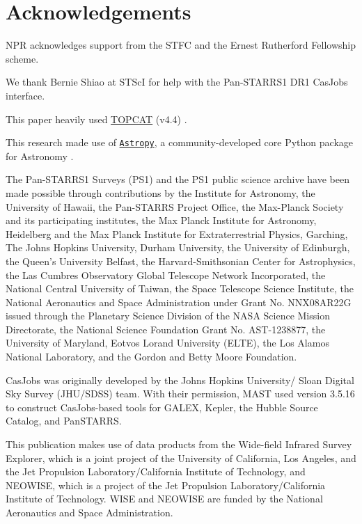 \documentclass[usenatbib]{mnras}
\begin{document}
\section*{Acknowledgements}
NPR acknowledges support from the STFC and the Ernest Rutherford Fellowship scheme. 

We thank Bernie Shiao at STScI for help with the Pan-STARRS1 DR1 CasJobs interface. 

This paper heavily used \href{http://www.star.bris.ac.uk/~mbt/topcat/}{TOPCAT} (v4.4)
\citep[][]{Taylor2005, Taylor2011}.

This research made use of \href{http://www.astropy.org}{\tt Astropy}, 
a community-developed core Python package for Astronomy 
\citep{AstropyCollaboration2013, AstropyCollaboration2018}. 

The Pan-STARRS1 Surveys (PS1) and the PS1 public science archive have
been made possible through contributions by the Institute for
Astronomy, the University of Hawaii, the Pan-STARRS Project Office,
the Max-Planck Society and its participating institutes, the Max
Planck Institute for Astronomy, Heidelberg and the Max Planck
Institute for Extraterrestrial Physics, Garching, The Johns Hopkins
University, Durham University, the University of Edinburgh, the
Queen's University Belfast, the Harvard-Smithsonian Center for
Astrophysics, the Las Cumbres Observatory Global Telescope Network
Incorporated, the National Central University of Taiwan, the Space
Telescope Science Institute, the National Aeronautics and Space
Administration under Grant No. NNX08AR22G issued through the Planetary
Science Division of the NASA Science Mission Directorate, the National
Science Foundation Grant No. AST-1238877, the University of Maryland,
Eotvos Lorand University (ELTE), the Los Alamos National Laboratory,
and the Gordon and Betty Moore Foundation.

CasJobs was originally developed by the Johns Hopkins University/
Sloan Digital Sky Survey (JHU/SDSS) team. With their permission, MAST
used version 3.5.16 to construct CasJobs-based tools for GALEX,
Kepler, the Hubble Source Catalog, and PanSTARRS.

This publication makes use of data products from the Wide-field
Infrared Survey Explorer, which is a joint project of the University
of California, Los Angeles, and the Jet Propulsion
Laboratory/California Institute of Technology, and NEOWISE, which is a
project of the Jet Propulsion Laboratory/California Institute of
Technology. WISE and NEOWISE are funded by the National Aeronautics
and Space Administration.
\end{document}

